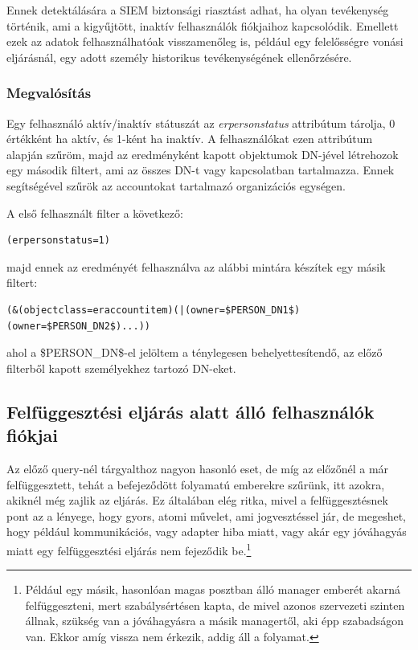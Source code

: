 		Ennek detektálására a SIEM biztonsági riasztást adhat, ha olyan tevékenység történik, ami a kigyűjtött, inaktív felhasználók fiókjaihoz kapcsolódik. Emellett ezek az adatok felhasználhatóak visszamenőleg is, például egy felelősségre vonási eljárásnál, egy adott személy historikus tevékenységének ellenőrzésére.
		 
	\subsubsection{Megvalósítás}
		
		Egy felhasználó aktív/inaktív státuszát az \textit{erpersonstatus} attribútum tárolja, 0 értékként ha aktív, és 1-ként ha inaktív. A felhasználókat ezen attribútum alapján szűröm, majd az eredményként kapott objektumok DN-jével létrehozok egy második filtert, ami az összes DN-t vagy kapcsolatban tartalmazza. Ennek segítségével szűrök az accountokat tartalmazó organizációs egységen.
		
		A első felhasznált filter a következő:
		\begin{lstlisting}
(erpersonstatus=1)\end{lstlisting}
		
		majd ennek az eredményét felhasználva az alábbi mintára készítek egy másik filtert:
		\begin{lstlisting}
(&(objectclass=eraccountitem)(|(owner=$PERSON_DN1$)(owner=$PERSON_DN2$)...))\end{lstlisting} \label{code:accownerfilter}
		ahol a \$PERSON\_DN\$-el jelöltem a ténylegesen behelyettesítendő, az előző filterből kapott személyekhez tartozó DN-eket.
		
\subsection{Felfüggesztési eljárás alatt álló felhasználók fiókjai}
Az előző query-nél tárgyalthoz nagyon hasonló eset, de míg az előzőnél a már felfüggesztett, tehát a befejeződött folyamatú emberekre szűrünk, itt azokra, akiknél még zajlik az eljárás. Ez általában elég ritka, mivel a felfüggesztésnek pont az a lényege, hogy gyors, atomi művelet, ami jogvesztéssel jár, de megeshet, hogy például kommunikációs, vagy adapter hiba miatt, vagy akár egy jóváhagyás miatt egy felfüggesztési eljárás nem fejeződik be.\footnote{Például egy másik, hasonlóan magas posztban álló manager emberét akarná felfüggeszteni, mert szabálysértésen kapta, de mivel azonos szervezeti szinten állnak, szükség van a jóváhagyásra a másik managertől, aki épp szabadságon van. Ekkor amíg vissza nem érkezik, addig áll a folyamat.}
